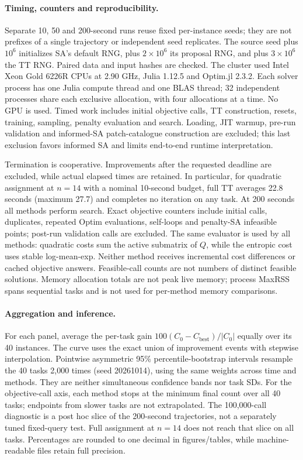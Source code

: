 \paragraph{Timing, counters and reproducibility.}
Separate 10, 50 and 200-second runs reuse fixed per-instance seeds; they are not
prefixes of a single trajectory or independent seed replicates. The source
seed plus $10^6$ initializes SA's default RNG, plus $2\times10^6$ its proposal
RNG, and plus $3\times10^6$ the TT RNG. Paired data and input hashes are checked.
The cluster used Intel Xeon Gold 6226R CPUs at 2.90 GHz, Julia 1.12.5 and
Optim.jl 2.3.2. Each solver process has one Julia compute thread and one BLAS
thread; 32 independent processes share each exclusive allocation, with four
allocations at a time. No GPU is used. Timed work includes initial objective
calls, TT construction, resets, training, sampling, penalty evaluation and
search. Loading, JIT warmup, pre-run validation and informed-SA patch-catalogue
construction are excluded; this last exclusion favors informed SA and limits
end-to-end runtime interpretation.

Termination is cooperative. Improvements after the requested deadline are
excluded, while actual elapsed times are retained. In particular, for quadratic
assignment at $n=14$ with a nominal 10-second budget, full TT averages 22.8
seconds (maximum 27.7) and completes no iteration on any task. At 200 seconds
all methods perform search. Exact objective counters include initial calls,
duplicates, repeated Optim evaluations, self-loops and penalty-SA infeasible
points; post-run validation calls are excluded. The same evaluator is used
by all methods: quadratic costs sum the active submatrix of $Q$, while the
entropic cost uses stable log-mean-exp. Neither method receives incremental
cost differences or cached objective answers. Feasible-call counts are not
numbers of distinct feasible solutions. Memory allocation totals are not
peak live memory; process MaxRSS spans sequential tasks and is not used for
per-method memory comparisons.

\paragraph{Aggregation and inference.}
For each panel, average the per-task gain
$100(C_0-C_{\mathrm{best}})/|C_0|$ equally over its 40 instances. The curve
uses the exact union of improvement events with stepwise interpolation.
Pointwise asymmetric 95\% percentile-bootstrap intervals resample the 40
tasks 2,000 times (seed 20261014), using the same weights across time and
methods. They are neither simultaneous confidence bands nor task SDs.
For the objective-call axis, each method stops at the minimum final count
over all 40 tasks; endpoints from slower tasks are not extrapolated. The
100,000-call diagnostic is a post hoc slice of the 200-second trajectories,
not a separately tuned fixed-query test. Full assignment at $n=14$ does not
reach that slice on all tasks. Percentages are rounded to one decimal in
figures/tables, while machine-readable files retain full precision.

